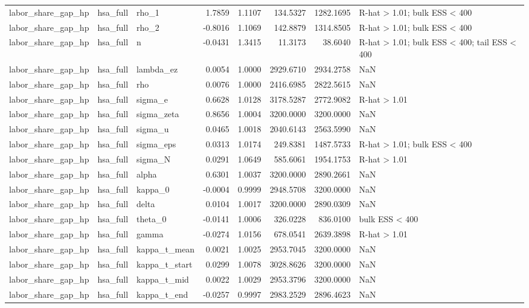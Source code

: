 \begin{tabular}{lllrrrrl}
labor\_share\_gap\_hp & hsa\_full & rho\_1 & 1.7859 & 1.1107 & 134.5327 & 1282.1695 & R-hat > 1.01; bulk ESS < 400 \\
labor\_share\_gap\_hp & hsa\_full & rho\_2 & -0.8016 & 1.1069 & 142.8879 & 1314.8505 & R-hat > 1.01; bulk ESS < 400 \\
labor\_share\_gap\_hp & hsa\_full & n & -0.0431 & 1.3415 & 11.3173 & 38.6040 & R-hat > 1.01; bulk ESS < 400; tail ESS < 400 \\
labor\_share\_gap\_hp & hsa\_full & lambda\_ez & 0.0054 & 1.0000 & 2929.6710 & 2934.2758 & NaN \\
labor\_share\_gap\_hp & hsa\_full & rho & 0.0076 & 1.0000 & 2416.6985 & 2822.5615 & NaN \\
labor\_share\_gap\_hp & hsa\_full & sigma\_e & 0.6628 & 1.0128 & 3178.5287 & 2772.9082 & R-hat > 1.01 \\
labor\_share\_gap\_hp & hsa\_full & sigma\_zeta & 0.8656 & 1.0004 & 3200.0000 & 3200.0000 & NaN \\
labor\_share\_gap\_hp & hsa\_full & sigma\_u & 0.0465 & 1.0018 & 2040.6143 & 2563.5990 & NaN \\
labor\_share\_gap\_hp & hsa\_full & sigma\_eps & 0.0313 & 1.0174 & 249.8381 & 1487.5733 & R-hat > 1.01; bulk ESS < 400 \\
labor\_share\_gap\_hp & hsa\_full & sigma\_N & 0.0291 & 1.0649 & 585.6061 & 1954.1753 & R-hat > 1.01 \\
labor\_share\_gap\_hp & hsa\_full & alpha & 0.6301 & 1.0037 & 3200.0000 & 2890.2661 & NaN \\
labor\_share\_gap\_hp & hsa\_full & kappa\_0 & -0.0004 & 0.9999 & 2948.5708 & 3200.0000 & NaN \\
labor\_share\_gap\_hp & hsa\_full & delta & 0.0104 & 1.0017 & 3200.0000 & 2890.0309 & NaN \\
labor\_share\_gap\_hp & hsa\_full & theta\_0 & -0.0141 & 1.0006 & 326.0228 & 836.0100 & bulk ESS < 400 \\
labor\_share\_gap\_hp & hsa\_full & gamma & -0.0274 & 1.0156 & 678.0541 & 2639.3898 & R-hat > 1.01 \\
labor\_share\_gap\_hp & hsa\_full & kappa\_t\_mean & 0.0021 & 1.0025 & 2953.7045 & 3200.0000 & NaN \\
labor\_share\_gap\_hp & hsa\_full & kappa\_t\_start & 0.0299 & 1.0078 & 3028.8626 & 3200.0000 & NaN \\
labor\_share\_gap\_hp & hsa\_full & kappa\_t\_mid & 0.0022 & 1.0029 & 2953.3796 & 3200.0000 & NaN \\
labor\_share\_gap\_hp & hsa\_full & kappa\_t\_end & -0.0257 & 0.9997 & 2983.2529 & 2896.4623 & NaN \\

\end{tabular}
